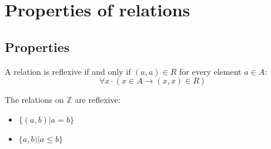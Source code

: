 \section{Properties of relations}
\subsection{Properties}
A relation is reflexive if and only if \((a, a) \in R\) for every element \(a \in A\):
\begin{equation*}
    \forall x \cdotp (x \in A \rightarrow (x, x) \in R)
\end{equation*}
\begin{example}
    The relations on \(\mathbb{Z}\) are reflexive:
    \begin{itemize}
        \item \(\{(a, b) | a = b\}\)
        \item \(\{a, b) | a \leq b\}\)
    \end{itemize}
\end{example}
